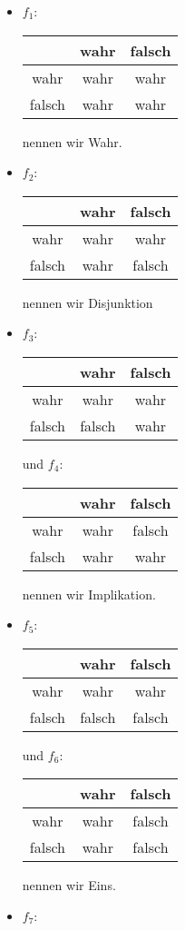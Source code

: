 \begin{solution}
\phantom{}
\begin{itemize}
  \item $f_1$:\quad\begin{tabular}{|c||c|c|}
\hline
 & wahr & falsch \\
\hline
\hline
wahr & wahr & wahr \\
\hline
falsch & wahr & wahr \\
\hline
\end{tabular} nennen wir Wahr.
  \item $f_2$:\quad\begin{tabular}{|c||c|c|}
\hline
& wahr & falsch \\
\hline
\hline
wahr & wahr & wahr \\
\hline
falsch & wahr & falsch \\
\hline
\end{tabular} nennen wir Disjunktion
\item $f_3$:\quad\begin{tabular}{|c||c|c|}
\hline
& wahr & falsch \\
\hline
\hline
wahr & wahr & wahr \\
\hline
falsch & falsch & wahr \\
\hline
\end{tabular} und
$f_4$:\quad\begin{tabular}{|c||c|c|}
\hline
& wahr & falsch \\
\hline
\hline
wahr & wahr & falsch \\
\hline
falsch & wahr & wahr \\
\hline
\end{tabular}
nennen wir Implikation.
\item $f_5$:\quad\begin{tabular}{|c||c|c|}
\hline
& wahr & falsch \\
\hline
\hline
wahr & wahr & wahr \\
\hline
falsch & falsch & falsch \\
\hline
\end{tabular} und
$f_6$:\quad\begin{tabular}{|c||c|c|}
\hline
& wahr & falsch \\
\hline
\hline
wahr & wahr & falsch \\
\hline
falsch & wahr & falsch\\
\hline
\end{tabular} nennen wir Eins.
\item
$f_7$:\quad\begin{tabular}{|c||c|c|}

\end{tabular}
\end{itemize}
\end{solution}
